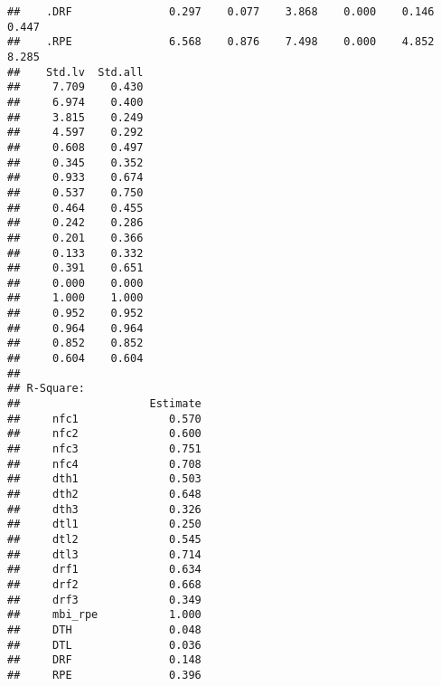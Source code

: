 \documentclass[
  english,
  man]{apa6}
\begin{document}
\begin{verbatim}
##    .DRF               0.297    0.077    3.868    0.000    0.146    0.447
##    .RPE               6.568    0.876    7.498    0.000    4.852    8.285
##    Std.lv  Std.all
##     7.709    0.430
##     6.974    0.400
##     3.815    0.249
##     4.597    0.292
##     0.608    0.497
##     0.345    0.352
##     0.933    0.674
##     0.537    0.750
##     0.464    0.455
##     0.242    0.286
##     0.201    0.366
##     0.133    0.332
##     0.391    0.651
##     0.000    0.000
##     1.000    1.000
##     0.952    0.952
##     0.964    0.964
##     0.852    0.852
##     0.604    0.604
## 
## R-Square:
##                    Estimate
##     nfc1              0.570
##     nfc2              0.600
##     nfc3              0.751
##     nfc4              0.708
##     dth1              0.503
##     dth2              0.648
##     dth3              0.326
##     dtl1              0.250
##     dtl2              0.545
##     dtl3              0.714
##     drf1              0.634
##     drf2              0.668
##     drf3              0.349
##     mbi_rpe           1.000
##     DTH               0.048
##     DTL               0.036
##     DRF               0.148
##     RPE               0.396
\end{verbatim}
\end{document}
